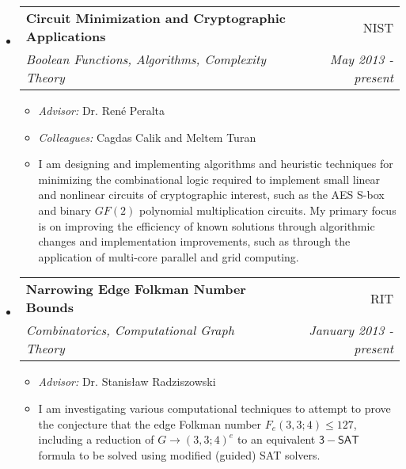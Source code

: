 \documentclass[letterpaper,10pt]{article}
\makeatletter
\newcommand{\resitem}[1]{\item #1 \vspace{-2pt}}
\newcommand{\ressubheading}[4]{
\begin{tabular*}{6.5in}{l@{\cftdotfill{\cftsecdotsep}\extracolsep{\fill}}r}
		\textbf{#1} & #2 \\
		\textit{#3} & \textit{#4} \\
\end{tabular*}\vspace{-6pt}}
\makeatother
\begin{document}
\begin{itemize}
\item
	\ressubheading{Circuit Minimization and Cryptographic Applications}{NIST}{Boolean Functions, Algorithms, Complexity Theory}{May 2013 - present}
	\begin{itemize}
		\resitem{\emph{Advisor:} Dr. Ren\'{e} Peralta} 
		\resitem{\emph{Colleagues:} Cagdas Calik and Meltem Turan}
		\resitem{I am designing and implementing algorithms and heuristic techniques for minimizing the combinational logic required to implement small linear and nonlinear circuits of cryptographic interest, such as the AES S-box and binary $GF(2)$ polynomial multiplication circuits. My primary focus is on improving the efficiency of known solutions through algorithmic changes and implementation improvements, such as through the application of multi-core parallel and grid computing.}
	\end{itemize}

\item
	\ressubheading{Narrowing Edge Folkman Number Bounds}{RIT}{Combinatorics, Computational Graph Theory}{January 2013 - present}
	\begin{itemize}
		\resitem{\emph{Advisor:} Dr. Stanis{\l}aw Radziszowski}
		\resitem{I am investigating various computational techniques to attempt to prove the conjecture that the edge Folkman number $F_e(3,3;4) \leq 127$, including a reduction of $G \to (3,3;4)^e$ to an equivalent $\mathsf{3-SAT}$ formula to be solved using modified (guided) SAT solvers.}
	\end{itemize}



\end{itemize}
\end{document}
